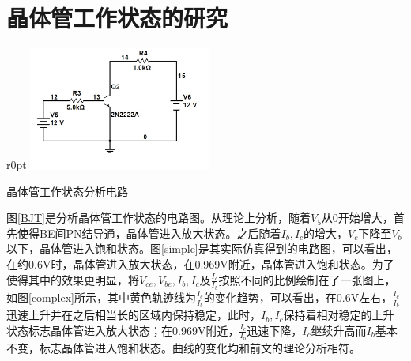 \documentclass[UTF8,a4paper]{ctexart}
\begin{document}
\section{晶体管工作状态的研究}

\begin {wrapfigure}{r}{0pt}
\includegraphics [width=60mm]{cap/12.JPG}
\caption{晶体管工作状态分析电路}
\label{BJT}
\end {wrapfigure}
图\ref{BJT}是分析晶体管工作状态的电路图。从理论上分析，随着$V_5$从0开始增大，首先使得BE间PN结导通，晶体管进入放大状态。之后随着$I_b,I_c$的增大，$V_{c}$下降至$V_b$以下，晶体管进入饱和状态。图\ref{simple}是其实际仿真得到的电路图，可以看出，在约0.6V时，晶体管进入放大状态，在0.969V附近，晶体管进入饱和状态。为了使得其中的效果更明显，将$V_{ce},V_{be},I_b,I_c$及$\frac{I_c}{I_b}$按照不同的比例绘制在了一张图上，如图\ref{complex}所示，其中黄色轨迹线为$\frac{I_c}{I_b}$的变化趋势，可以看出，在0.6V左右，$\frac{I_c}{I_b}$迅速上升并在之后相当长的区域内保持稳定，此时，$I_b,I_c$保持着相对稳定的上升状态标志晶体管进入放大状态；在0.969V附近，$\frac{I_c}{I_b}$迅速下降，$I_c$继续升高而$I_b$基本不变，标志晶体管进入饱和状态。曲线的变化均和前文的理论分析相符。
\end{document}
